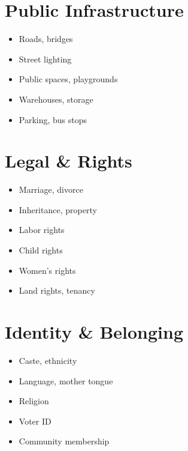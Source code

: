 \documentclass[11pt,a4paper]{article}
\begin{document}
\section{Public Infrastructure}

\begin{itemize}
    \item Roads, bridges
    \item Street lighting
    \item Public spaces, playgrounds
    \item Warehouses, storage
    \item Parking, bus stops
\end{itemize}

\section{Legal \& Rights}

\begin{itemize}
    \item Marriage, divorce
    \item Inheritance, property
    \item Labor rights
    \item Child rights
    \item Women's rights
    \item Land rights, tenancy
\end{itemize}

\section{Identity \& Belonging}

\begin{itemize}
    \item Caste, ethnicity
    \item Language, mother tongue
    \item Religion
    \item Voter ID
    \item Community membership
\end{itemize}
\end{document}
